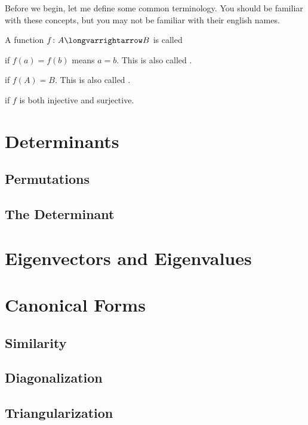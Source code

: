 \documentclass[10pt]{article}
\let\longto=\longvarrightarrow
\let\longto=\longvarrightarrow
\begin{document}

\bigskip

\tableofcontents

\newpage

Before we begin, let me define some common terminology.
You should be familiar with these concepts, but you may not be familiar with their english names.

\begin{defn*}

    A function $f\colon A\longto B$ is called
    \blist
        \item {} if $f(a)=f(b)$ means $a=b$.
        This is also called .
        \item {} if $f(A)=B$.
        This is also called .
        \item {} if $f$ is both injective and surjective.
    \elist

\end{defn*}

\section{Determinants}

\subsection{Permutations}



\subsection{The Determinant}



\newpage
\section{Eigenvectors and Eigenvalues}



\newpage
\section{Canonical Forms}

\subsection{Similarity}



\subsection{Diagonalization}



\subsection{Triangularization}


\end{document}
